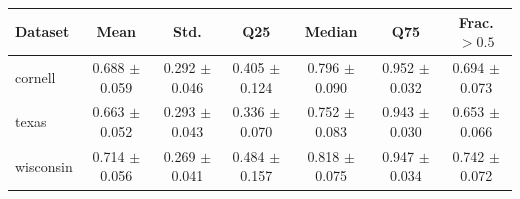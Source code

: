 \begin{tabular}{lcccccc}
\toprule
Dataset & Mean & Std. & Q25 & Median & Q75 & Frac. $>0.5$ \\
\midrule
cornell & 0.688 $\pm$ 0.059 & 0.292 $\pm$ 0.046 & 0.405 $\pm$ 0.124 & 0.796 $\pm$ 0.090 & 0.952 $\pm$ 0.032 & 0.694 $\pm$ 0.073 \\
texas & 0.663 $\pm$ 0.052 & 0.293 $\pm$ 0.043 & 0.336 $\pm$ 0.070 & 0.752 $\pm$ 0.083 & 0.943 $\pm$ 0.030 & 0.653 $\pm$ 0.066 \\
wisconsin & 0.714 $\pm$ 0.056 & 0.269 $\pm$ 0.041 & 0.484 $\pm$ 0.157 & 0.818 $\pm$ 0.075 & 0.947 $\pm$ 0.034 & 0.742 $\pm$ 0.072 \\
\bottomrule
\end{tabular}
